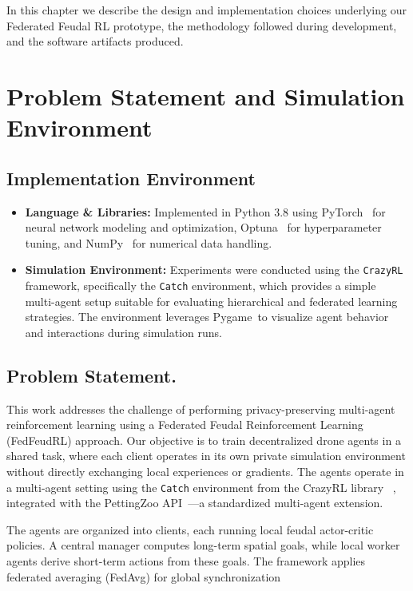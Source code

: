 \documentclass[12pt,a4paper,twoside,openany]{book}
\begin{document}
In this chapter we describe the design and implementation choices underlying our Federated Feudal RL prototype, the methodology followed during development, and the software artifacts produced.

\section{Problem Statement and Simulation Environment}

\subsection{Implementation Environment}
\begin{itemize}
  \item \textbf{Language \& Libraries:} Implemented in Python 3.8 using PyTorch~\cite{PyTorch} for neural network modeling and optimization, Optuna~\cite{Optuna} for hyperparameter tuning, and NumPy~\cite{NumPy} for numerical data handling.
  
  \item \textbf{Simulation Environment:} Experiments were conducted using the \texttt{CrazyRL}~\cite{CrazyRL} framework, specifically the \texttt{Catch} environment, which provides a simple multi-agent setup suitable for evaluating hierarchical and federated learning strategies. The environment leverages  Pygame~\cite{Pygame}to visualize agent behavior and interactions during simulation runs.
  
\end{itemize}

\subsection{Problem Statement.} 
This work addresses the challenge of performing privacy-preserving multi-agent reinforcement learning using a Federated Feudal Reinforcement Learning (FedFeudRL) approach. Our objective is to train decentralized drone agents in a shared task, where each client operates in its own private simulation environment without directly exchanging local experiences or gradients. The agents operate in a multi-agent setting using the \texttt{Catch} environment from the CrazyRL library ~\cite{CrazyRL}, integrated with the PettingZoo API~\cite{PettingZoo}—a standardized multi-agent extension. 

The agents are organized into clients, each running local feudal actor-critic policies. A central manager computes long-term spatial goals, while local worker agents derive short-term actions from these goals. The framework applies federated averaging (FedAvg) for global synchronization
\end{document}
